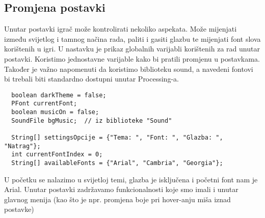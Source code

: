 \documentclass{article}
\begin{document}
\subsection{Promjena postavki}

Unutar postavki igrač može kontrolirati nekoliko aspekata. Može mijenjati između svijetlog i tamnog načina rada, paliti i gasiti glazbu te mijenjati font slova korištenih u igri.
U nastavku je prikaz globalnih varijabli korištenih za rad unutar postavki. Koristimo jednostavne varijable kako bi pratili promjenu u postavkama. Također je važno napomenuti da koristimo biblioteku sound, a navedeni fontovi bi trebali biti standardno dostupni unutar Processing-a.


\begin{verbatim}
  boolean darkTheme = false;
  PFont currentFont;
  boolean musicOn = false;
  SoundFile bgMusic;  // iz biblioteke "Sound"

  String[] settingsOpcije = {"Tema: ", "Font: ", "Glazba: ", "Natrag"};
  int currentFontIndex = 0;
  String[] availableFonts = {"Arial", "Cambria", "Georgia"};
\end{verbatim}

U početku se nalazimo u svijetloj temi, glazba je isključena i početni font nam je Arial. 
Unutar postavki zadržavamo funkcionalnosti koje smo imali i unutar glavnog menija (kao što je npr. promjena boje pri hover-anju miša iznad postavke)
\end{document}
